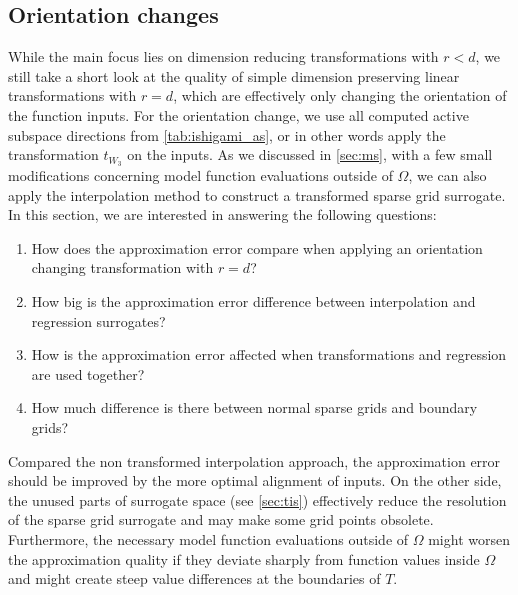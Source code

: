 \documentclass[
  a4paper,  %
  twoside,  %
  bibliography=totoc,
  headsepline,
  cleardoublepage=empty,
  parskip=half,
  draft=false
]{scrbook}
\begin{document}
\subsection{Orientation changes}

While the main focus lies on dimension reducing transformations with $r < d$, we still take a short look at the quality of simple dimension preserving linear transformations with $r=d$, which are effectively only changing the orientation of the function inputs.
For the orientation change, we use all computed active subspace directions from \cref{tab:ishigami_as}, or in other words apply the transformation $t_{W_3}$ on the inputs.
As we discussed in \cref{sec:ms}, with a few small modifications concerning model function evaluations outside of $\Omega$, we can also apply the interpolation method to construct a transformed sparse grid surrogate.
In this section, we are interested in answering the following questions:
\begin{enumerate}
\item How does the approximation error compare when applying an orientation changing transformation with $r=d$?
\item How big is the approximation error difference between interpolation and regression surrogates?
\item How is the approximation error affected when transformations and regression are used together?
\item How much difference is there between normal sparse grids and boundary grids?
\end{enumerate}
%
Compared the non transformed interpolation approach, the approximation error should be improved by the more optimal alignment of inputs.
On the other side, the unused parts of surrogate space (see \cref{sec:tis}) effectively reduce the resolution of the sparse grid surrogate and may make some grid points obsolete.
Furthermore, the necessary model function evaluations outside of $\Omega$ might worsen the approximation quality if they deviate sharply from function values inside $\Omega$ and might create steep value differences at the boundaries of $T$.
\end{document}
